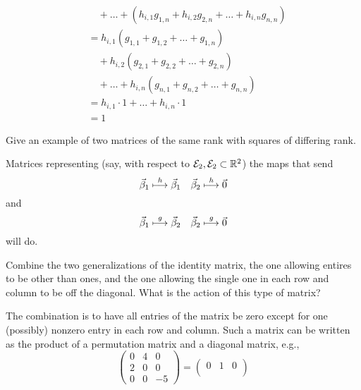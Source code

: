 \begin{exercises}
\begin{answer}
\begin{align*}
       &\text{}\quad
        +\dots+(h_{i,1}g_{1,n}+h_{i,2}g_{2,n}+\dots+h_{i,n}g_{n,n})  \\
       &=h_{i,1}(g_{1,1}+g_{1,2}+\dots+g_{1,n})  \\
       &\text{}\quad+h_{i,2}(g_{2,1}+g_{2,2}+\dots+g_{2,n}) \\
       &\text{}\quad
        +\dots+h_{i,n}(g_{n,1}+g_{n,2}+\dots+g_{n,n})  \\
       &=h_{i,1}\cdot 1+\dots+h_{i,n}\cdot 1  \\
       &=1
     \end{align*}  
    \end{answer}
  \recommended \item
    Give an example of two matrices of the same rank with squares of
    differing rank.
    \begin{answer}
      Matrices representing (say, with respect to
      \( {\cal E}_2,{\cal E}_2\subset\mathbb{R}^2 \)) the maps that send
      \begin{equation*}
        \vec{\beta}_1 \stackrel{h}{\longmapsto} \vec{\beta}_1
        \quad
        \vec{\beta}_2 \stackrel{h}{\longmapsto} \vec{0}
      \end{equation*}
      and
      \begin{equation*}
        \vec{\beta}_1 \stackrel{g}{\longmapsto} \vec{\beta}_2
        \quad
        \vec{\beta}_2 \stackrel{g}{\longmapsto} \vec{0}
      \end{equation*}
      will do.  
    \end{answer}
  \item 
    Combine the two generalizations of the identity matrix,
    the one allowing entires to be other than ones, and the one allowing the
    single one in each row and column to be off the diagonal.
    What is the action of this type of matrix?
    \begin{answer}
      The combination is to have all entries of the matrix be zero
      except for one (possibly) nonzero entry in each row and column.
      Such a matrix can be written as the product of a permutation matrix and
      a diagonal matrix, e.g.,
      \begin{equation*}
        \begin{pmatrix}
          0  &4  &0  \\
          2  &0  &0  \\
          0  &0  &-5
        \end{pmatrix}
        =\begin{pmatrix}
          0  &1  &0  \\

\end{pmatrix}
\end{equation*}
\end{answer}
\end{exercises}
